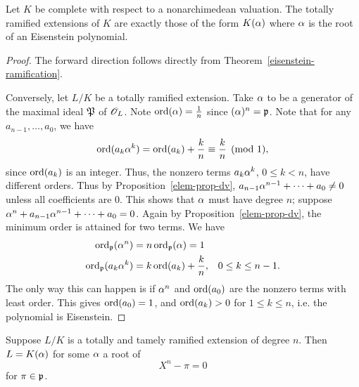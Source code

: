 \begin{thm}
Let $K$ be complete with respect to a nonarchimedean valuation. 
The totally ramified extensions of $K$ are exactly those of the form $K(\alpha)$ where $\alpha$ is the root of an Eisenstein polynomial.
\end{thm}
\begin{proof}
The forward direction follows directly from Theorem~\ref{eisenstein-ramification}.

Conversely, let $L/K$ be a totally ramified extension. Take $\alpha$ to be a generator of the maximal ideal $\mathfrak{P}$ of $\mathscr{O}_L$. Note $\operatorname{ord}(\alpha)=\frac{1}{n}$ since $(\alpha)^n=\mathfrak{p}$. Note that for any $a_{n-1},\ldots, a_0$, we have
\[
\operatorname{ord}(a_k\alpha^k)=\operatorname{ord}(a_k)+\frac{k}{n}\equiv \frac{k}{n}\pmod 1,
\]
since $\operatorname{ord}(a_k)$ is an integer. Thus, the nonzero terms $a_k\alpha^k$, $0\le k<n$, have different orders. Thus by Proposition~\ref{elem-prop-dv}, $a_{n-1}\alpha^{n-1}+\cdots +a_0\ne 0$ unless all coefficients are 0. This shows that $\alpha$ must have degree $n$; suppose $\alpha^n+a_{n-1}\alpha^{n-1}+\cdots +a_0=0$. Again by Proposition~\ref{elem-prop-dv}, the minimum order is attained for two terms. We have
\begin{align*}
\operatorname{ord}_{\mathfrak{p}}(\alpha^n)&=n\operatorname{ord}_{\mathfrak{p}}(\alpha)=1\\
\operatorname{ord}_{\mathfrak{p}}(a_k\alpha^k)&=k\operatorname{ord}(a_k)+\frac{k}{n},&0\le k\le n-1.
\end{align*}
The only way this can happen 
is if $\alpha^n$ and $\operatorname{ord}(a_0)$ are the nonzero terms with least order. This gives $\operatorname{ord}(a_0)=1$, and $\operatorname{ord}(a_k)>0$ for $1\le k\le n$, i.e. the polynomial is Eisenstein.
\end{proof}
\begin{thm}
Suppose $L/K$ is a totally and tamely ramified extension of degree $n$.
Then $L=K(\alpha)$ for some $\alpha$ a root of
\[
X^n-\pi=0
\]
for $\pi \in \mathfrak{p}$.
%
\end{thm}
